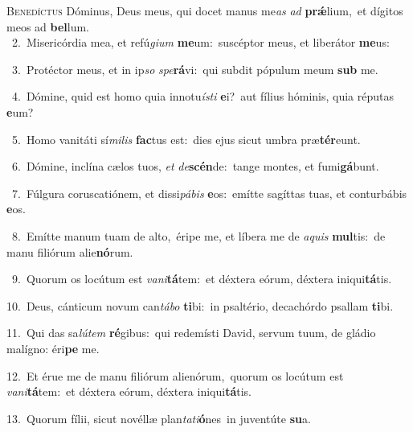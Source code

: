 \lettrine{\initial\textcolor{\initialcolor}{B}}{enedíctus} Dóminus, Deus meus, qui docet manus me\textit{as} \textit{ad} \textbf{prǽ}\-lium,~\star et dígitos meos ad \textbf{bel}\-lum.\\
{\numbfont\textcolor{\numbcolor}{~2.}}~Misericórdia mea, et refú\-\textit{gi}\-\textit{um} \textbf{me}\-um:~\star suscéptor meus, et liberátor \textbf{me}\-us:\par
{\numbfont\textcolor{\numbcolor}{~3.}}~Protéctor meus, et in ip\textit{so} \textit{spe}\-\textbf{rá}vi:~\star qui subdit pópulum meum \textbf{sub} me.\par
{\numbfont\textcolor{\numbcolor}{~4.}}~Dómine, quid est homo quia innotu\-\textit{ís}\-\textit{ti} \textbf{e}\-i?~\star aut fílius hóminis, quia réputas \textbf{e}\-um?\par
{\numbfont\textcolor{\numbcolor}{~5.}}~Homo vanitáti sí\-\textit{mi}\-\textit{lis} \textbf{fac}\-tus est:~\star dies ejus sicut umbra præ\-\textbf{tér}\-eunt.\par
{\numbfont\textcolor{\numbcolor}{~6.}}~Dómine, inclína cælos tuos, \textit{et} \textit{de}\-\textbf{scén}de:~\star tange montes, et fumi\-\textbf{gá}\-bunt.\par
{\numbfont\textcolor{\numbcolor}{~7.}}~Fúlgura coruscatiónem, et dissi\-\textit{pá}\-\textit{bis} \textbf{e}\-os:~\star emítte sagíttas tuas, et conturbábis \textbf{e}\-os.\par
{\numbfont\textcolor{\numbcolor}{~8.}}~Emítte manum tuam de alto,~\dagger éripe me, et líbera me de \textit{a}\-\textit{quis} \textbf{mul}\-tis:~\star de manu filiórum alie\-\textbf{nó}\-rum.\par
{\numbfont\textcolor{\numbcolor}{~9.}}~Quorum os locútum est \textit{va}\-\textit{ni}\textbf{tá}tem:~\star et déxtera eórum, déxtera iniqui\-\textbf{tá}\-tis.\par
{\numbfont\textcolor{\numbcolor}{10.}}~Deus, cánticum novum can\-\textit{tá}\-\textit{bo} \textbf{ti}\-bi:~\star in psaltério, decachórdo psallam \textbf{ti}\-bi.\par
{\numbfont\textcolor{\numbcolor}{11.}}~Qui das sa\-\textit{lú}\-\textit{tem} \textbf{ré}\-gibus:~\star qui redemísti David, servum tuum, de gládio malígno: éri\textbf{pe} me.\par
{\numbfont\textcolor{\numbcolor}{12.}}~Et érue me de manu filiórum alienórum,~\dagger quorum os locútum est \textit{va}\-\textit{ni}\textbf{tá}tem:~\star et déxtera eórum, déxtera iniqui\-\textbf{tá}\-tis.\par
{\numbfont\textcolor{\numbcolor}{13.}}~Quorum fílii, sicut novéllæ plan\-\textit{ta}\-\textit{ti}\textbf{ó}nes~\star in juventúte \textbf{su}\-a.\par
